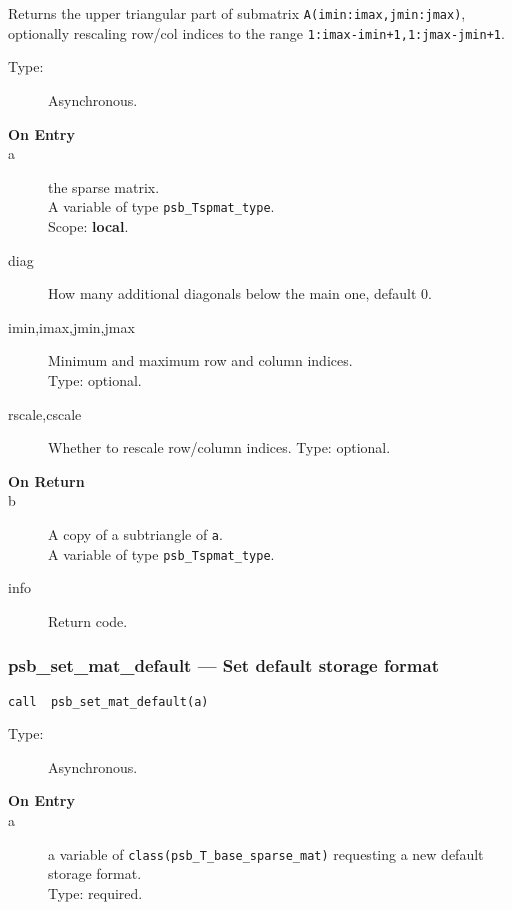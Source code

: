 Returns the upper triangular part of submatrix
\verb|A(imin:imax,jmin:jmax)|, optionally rescaling row/col indices to
the range \verb|1:imax-imin+1,1:jmax-jmin+1|.   
\begin{description}
\item[Type:] Asynchronous.
\item[\bf On Entry]
\item[a] the sparse matrix.\\
A variable of type \verb|psb_Tspmat_type|.\\
Scope: {\bf local}.\\
\item[diag] How many additional diagonals below the main one, default 0.
\item[imin,imax,jmin,jmax] Minimum and maximum row and column indices.\\
Type: optional.
\item[rscale,cscale] Whether to rescale row/column indices.
Type: optional.
\end{description}
\begin{description}
\item[\bf On Return]
\item[b] A copy  of a subtriangle of \verb|a|.\\
A variable of type \verb|psb_Tspmat_type|.
\item[info] Return code. 
\end{description}




\subsubsection*{psb\_set\_mat\_default --- Set default  storage format}


\begin{verbatim}
call  psb_set_mat_default(a)
\end{verbatim}

\begin{description}
\item[Type:] Asynchronous.
\item[\bf On Entry]
\item[a] a variable of \verb|class(psb_T_base_sparse_mat)|  requesting
  a new default storage format.\\ 
Type: required.
\end{description}





